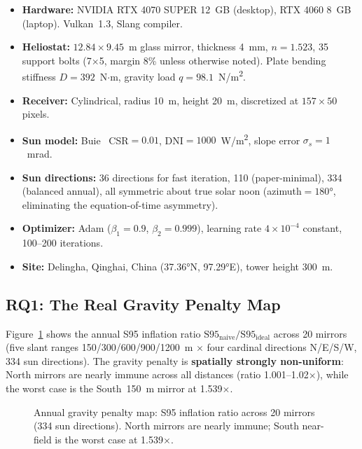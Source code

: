 \documentclass{CVM}
\begin{document}
\begin{itemize}
  \item \textbf{Hardware:} NVIDIA RTX 4070 SUPER 12~GB (desktop), RTX 4060
  8~GB (laptop). Vulkan~1.3, Slang compiler.
  \item \textbf{Heliostat:} $12.84 \times 9.45$~m glass mirror, thickness
  \SI{4}{\milli\meter}, $n=1.523$, 35 support bolts (7$\times$5, margin 8\%
  unless otherwise noted). Plate bending stiffness $D=392$~N$\cdot$m, gravity
  load $q=98.1$~N/m\textsuperscript{2}.
  \item \textbf{Receiver:} Cylindrical, radius \SI{10}{\meter}, height
  \SI{20}{\meter}, discretized at $157\times50$ pixels.
  \item \textbf{Sun model:} Buie~\cite{buie2003} CSR$=0.01$, DNI$=1000$~W/m\textsuperscript{2},
  slope error $\sigma_s = 1$~mrad.
  \item \textbf{Sun directions:} 36 directions for fast iteration, 110
  (paper-minimal), 334 (balanced annual), all symmetric about true solar noon
  (azimuth$=180\si{\degree}$, eliminating the equation-of-time asymmetry).
  \item \textbf{Optimizer:} Adam ($\beta_1{=}0.9$, $\beta_2{=}0.999$),
  learning rate $4\times10^{-4}$ constant, 100--200 iterations.
  \item \textbf{Site:} Delingha, Qinghai, China (37.36\si{\degree}N,
  97.29\si{\degree}E), tower height \SI{300}{\meter}.
\end{itemize}

\subsection{RQ1: The Real Gravity Penalty Map}
\label{sec:exp_rq1}

Figure~\ref{fig:penalty} shows the annual S95 inflation ratio
$\text{S95}_{\text{naive}} / \text{S95}_{\text{ideal}}$ across 20 mirrors
(five slant ranges 150/300/600/900/1200~m $\times$ four cardinal directions
N/E/S/W, 334 sun directions). The gravity penalty is \textbf{spatially
strongly non-uniform}: North mirrors are nearly immune across all distances
(ratio 1.001--1.02$\times$), while the worst case is the South~\SI{150}{\meter}
mirror at 1.539$\times$.

\begin{figure}[t]
\centering
\caption{Annual gravity penalty map: S95 inflation ratio across 20 mirrors
(334 sun directions). North mirrors are nearly immune; South near-field is
the worst case at 1.539$\times$.}
\label{fig:penalty}
\end{figure}
\end{document}
